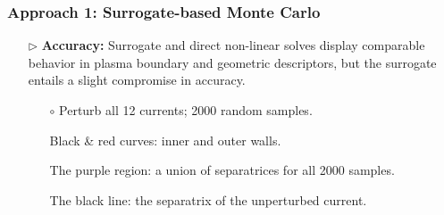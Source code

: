 \documentclass{beamer}
\begin{document}
\begin{frame}[t]
    \frametitle{Approach 1: Surrogate-based Monte Carlo}
\begin{itemize}[leftmargin=5pt] 


\vspace{1mm}
\item[$\triangleright$] \textcolor{myblue3}{\bf Accuracy:} 
    {\footnotesize
    Surrogate and direct non-linear solves display comparable behavior in plasma boundary and geometric descriptors, but the surrogate entails a slight compromise in accuracy.
    }
        \vspace{2mm}
        \begin{figure}[htb]\centering
        \end{figure}
        \vspace{2mm}
        {\fontsize{8}{8}\selectfont 
        \begin{itemize}[leftmargin=0pt]
        \item[$\circ$] Perturb all 12 currents; 2000 random samples. 
        \item[] \textcolor{myblue3}{Black \& red curves:} inner and outer walls.
        \item[] \textcolor{myblue3}{The purple region:} a union of separatrices for all 2000 samples. 
        \item[] \textcolor{myblue3}{The black line:} the separatrix of the unperturbed current. 
        

\end{itemize}}
\end{itemize}
\end{frame}
\end{document}
